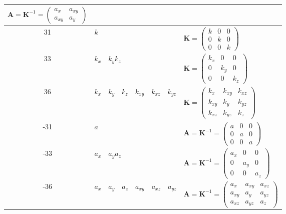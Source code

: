 \begin{description}
\begin{tabular}{|c|l|l|}
        $\mathbf{A}=\mathbf{K}^{-1}=\left(\begin{array}{cc} a_x & a_{xy} \\ a_{xy} & a_y\end{array}\right)$ \\
      \hline
      31 & $k$ &
       $\mathbf{K}=\left(\begin{array}{ccc} k & 0 & 0 \\ 0 & k & 0 \\ 0 & 0 & k \end{array}\right)$ \\
      \hline
      33 & $k_{x}\quad k_{y}$\quad $k_{z}$ &
       $\mathbf{K}=\left(\begin{array}{ccc} k_x & 0 & 0 \\ 0 & k_y & 0 \\ 0 & 0
       & k_z \end{array}\right)$ \\
      \hline
       36 & $k_{x}\quad k_{y}\quad k_{z}\quad k_{xy}\quad k_{xz}\quad k_{yz}$ & 
        $\mathbf{K}=\left(\begin{array}{ccc} k_x    & k_{xy} & k_{xz} \\ 
                                            k_{xy} & k_y    & k_{yz} \\
                                            k_{xz} & k_{yz} & k_z \end{array}\right)$ \\
      \hline
      -31 & $a$ &
       $\mathbf{A}=\mathbf{K}^{-1}=\left(\begin{array}{ccc} a & 0 & 0 \\ 0 & a & 0 \\ 0 & 0 & a \end{array}\right)$ \\
      \hline
      -33 & $a_{x}\quad a_{y}$\quad $a_{z}$ &
       $\mathbf{A}=\mathbf{K}^{-1}=\left(\begin{array}{ccc} a_x & 0 & 0 \\ 0 & a_y & 0 \\ 0 & 0
       & a_z \end{array}\right)$ \\
      \hline
      -36 & $a_{x}\quad a_{y}\quad a_{z}\quad a_{xy}\quad a_{xz}\quad a_{yz}$ & 
        $\mathbf{A}=\mathbf{K}^{-1}=\left(\begin{array}{ccc} a_x    & a_{xy} & a_{xz} \\ 
                                            a_{xy} & a_y    & a_{yz} \\
                                            a_{xz} & a_{yz} & a_z \end{array}\right)$ \\
      \hline
    \end{tabular}


\end{description}

